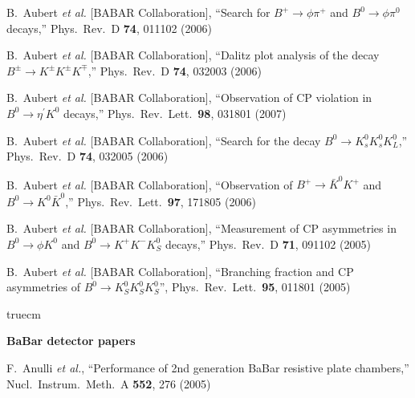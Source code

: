   B.~Aubert {\it et al.}  [BABAR Collaboration],
  ``Search for $B^+ \to \phi \pi^+$ and $B^0 \to \phi \pi^0$ decays,''
  Phys.\ Rev.\ D {\bf 74}, 011102 (2006)

  B.~Aubert {\it et al.}  [BABAR Collaboration],
  ``Dalitz plot analysis of the decay $B^{\pm} \to K^{\pm} K^{\pm} K^{\mp}$,''
  Phys.\ Rev.\  D {\bf 74}, 032003 (2006)


  B.~Aubert {\it et al.}  [BABAR Collaboration],
  ``Observation of CP violation in $B^0 \to \eta^\prime K^0$ decays,''
  Phys.\ Rev.\ Lett.\  {\bf 98}, 031801 (2007)

  B.~Aubert {\it et al.}  [BABAR Collaboration],
  ``Search for the decay $B^0 \to K^0_{s} K^0_{s} K^0_{L}$,''
  Phys.\ Rev.\  D {\bf 74}, 032005 (2006)

  B.~Aubert {\it et al.}  [BABAR Collaboration],
  ``Observation of $B^{+} \to \bar{K}^0 K^{+}$ and $B^0 \to K^0 \bar{K}^0$,''
  Phys.\ Rev.\ Lett.\  {\bf 97}, 171805 (2006)

  B.~Aubert {\it et al.}  [BABAR Collaboration],
   ``Measurement of CP asymmetries in $B^0 \to \phi K^0$ and $B^0 \to K^+ K^-K^0_S$  decays,''
  Phys.\ Rev.\ D {\bf 71}, 091102 (2005)

  B.~Aubert {\it et al.}  [BABAR Collaboration],
  ``Branching fraction and CP asymmetries of $B^0 \to K^0_S K^0_S K^0_S$'', 
  Phys.\ Rev.\ Lett.\  {\bf 95}, 011801 (2005)


 truecm

{\bf BaBar detector papers}

  F.~Anulli {\it et al.},
  ``Performance of 2nd generation BaBar resistive plate chambers,''
  Nucl.\ Instrum.\ Meth.\ A {\bf 552}, 276 (2005)

